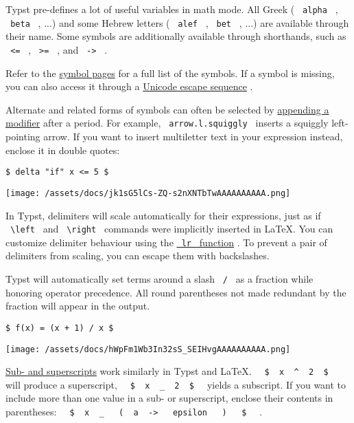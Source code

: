 Typst pre-defines a lot of useful variables in math mode. All Greek (
\texttt{\ alpha\ } , \texttt{\ beta\ } , ...) and some Hebrew letters (
\texttt{\ alef\ } , \texttt{\ bet\ } , ...) are available through their
name. Some symbols are additionally available through shorthands, such
as \texttt{\ \textless{}=\ } , \texttt{\ \textgreater{}=\ } , and
\texttt{\ -\textgreater{}\ } .

Refer to the \href{/docs/reference/symbols/}{symbol pages} for a full
list of the symbols. If a symbol is missing, you can also access it
through a \href{/docs/reference/syntax/\#escapes}{Unicode escape
sequence} .

Alternate and related forms of symbols can often be selected by
\href{/docs/reference/symbols/symbol/}{appending a modifier} after a
period. For example, \texttt{\ arrow.l.squiggly\ } inserts a squiggly
left-pointing arrow. If you want to insert multiletter text in your
expression instead, enclose it in double quotes:

\begin{verbatim}
$ delta "if" x <= 5 $
\end{verbatim}

\texttt{[image: /assets/docs/jk1sG5lCs-ZQ-s2nXNTbTwAAAAAAAAAA.png]}

In Typst, delimiters will scale automatically for their expressions,
just as if \texttt{\ \textbackslash{}left\ } and
\texttt{\ \textbackslash{}right\ } commands were implicitly inserted in
LaTeX. You can customize delimiter behaviour using the
\href{/docs/reference/math/lr/\#functions-lr}{\texttt{\ lr\ } function}
. To prevent a pair of delimiters from scaling, you can escape them with
backslashes.

Typst will automatically set terms around a slash \texttt{\ /\ } as a
fraction while honoring operator precedence. All round parentheses not
made redundant by the fraction will appear in the output.

\begin{verbatim}
$ f(x) = (x + 1) / x $
\end{verbatim}

\texttt{[image: /assets/docs/hWpFm1Wb3In32sS\_SEIHvgAAAAAAAAAA.png]}

\href{/docs/reference/math/attach/\#functions-attach}{Sub- and
superscripts} work similarly in Typst and LaTeX.
\texttt{\ }{\texttt{\ \$\ }}\texttt{\ x\ }{\texttt{\ \^{}\ }}\texttt{\ 2\ }{\texttt{\ \$\ }}\texttt{\ }
will produce a superscript,
\texttt{\ }{\texttt{\ \$\ }}\texttt{\ x\ }{\texttt{\ \_\ }}\texttt{\ 2\ }{\texttt{\ \$\ }}\texttt{\ }
yields a subscript. If you want to include more than one value in a sub-
or superscript, enclose their contents in parentheses:
\texttt{\ }{\texttt{\ \$\ }}\texttt{\ x\ }{\texttt{\ \_\ }}\texttt{\ }{\texttt{\ (\ }}\texttt{\ a\ }{\texttt{\ -\textgreater{}\ }}\texttt{\ }{\texttt{\ epsilon\ }}\texttt{\ }{\texttt{\ )\ }}\texttt{\ }{\texttt{\ \$\ }}\texttt{\ }
.


